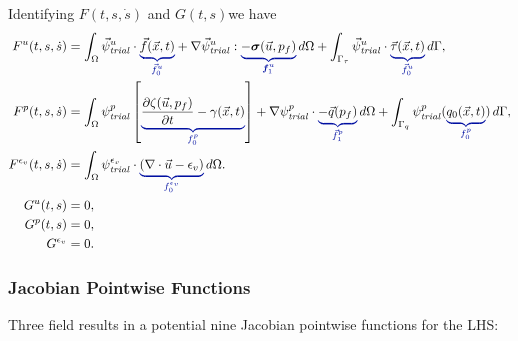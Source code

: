 Identifying $F(t,s,\dot{s})$ and $G(t,s)$we have
\begin{align}
  F^u(t,s,\dot{s})              & = \int_\Omega \trialvec[u] \cdot \eqnannotate{\vec{f}(\vec{x},t)}{\vec{f}^u_0}
  + \nabla \trialvec[u] : \eqnannotate{-\tensor{\sigma}(\vec{u},p_f)}{\tensor{f}^u_1} \, d\Omega
  + \int_{\Gamma_\tau} \trialvec[u] \cdot \eqnannotate{\vec{\tau}(\vec{x},t)}{\vec{f}^u_0} \, d\Gamma,                                                                               \\
  F^p(t,s,\dot{s})              & = \int_\Omega  \trialscalar[p] \left[\eqnannotate{\frac{\partial \zeta(\vec{u},p_f)}{\partial t} - \gamma(\vec{x},t)} {f^p_0}\right]
  + \nabla \trialscalar[p] \cdot \eqnannotate{-\vec{q}(p_f)}{\vec{f}^p_1} \, d\Omega
  + \int_{\Gamma_q} \trialscalar[p] (\eqnannotate{q_0(\vec{x},t)}{f^p_0}) \, d\Gamma,                                                                                                \\
  F^{\epsilon_{v}}(t,s,\dot{s}) & = \int_{\Omega} \trialscalar[\epsilon_{v}] \cdot \eqnannotate{\left(\nabla \cdot \vec{u} - \epsilon_{v} \right)}{f^{\epsilon_{v}}_{0}} \, d\Omega. \\
  G^u(t,s)                      & = 0,                                                                                                                                               \\
  G^p(t,s)                      & = 0,                                                                                                                                               \\
  G^{\epsilon_v}                & = 0.
\end{align}

\subsubsection{Jacobian Pointwise Functions}

Three field results in a potential nine Jacobian pointwise functions for the LHS:

